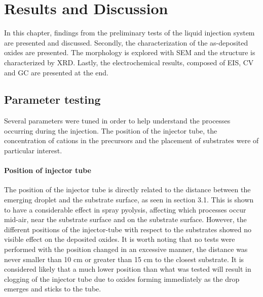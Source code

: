 \documentclass[Main/main.tex]{subfiles}
\begin{document}
\newpage
\chapter{Results and Discussion}







In this chapter, findings from the preliminary tests of the liquid injection system are presented and discussed. Secondly, the characterization of the as-deposited oxides are presented. The morphology is explored with SEM and the structure is characterized by XRD. Lastly, the electrochemical results, composed of EIS, CV and GC are presented at the end.


\section[Parameter testing]{Parameter testing}

 Several parameters were tuned in order to help understand the processes occurring during the injection. The position of the injector tube, the concentration of cations in the precursors and the placement of substrates were of particular interest.
 

 \subsubsection{Position of injector tube}
The position of the injector tube is directly related to the distance between the emerging droplet and the substrate surface, as seen in section 3.1. This is shown to have a considerable effect in spray pyolysis, affecting which processes occur mid-air, near the substrate surface and on the substrate surface. However, the different positions of the injector-tube with respect to the substrates showed no visible effect on the deposited oxides. It is worth noting that no tests were performed with the position changed in an excessive manner, the distance was never smaller than 10 cm or greater than 15 cm to the closest substrate. It is considered likely that a much lower position than what was tested will result in clogging of the injector tube due to oxides forming immediately as the drop emerges and sticks to the tube.
\end{document}
